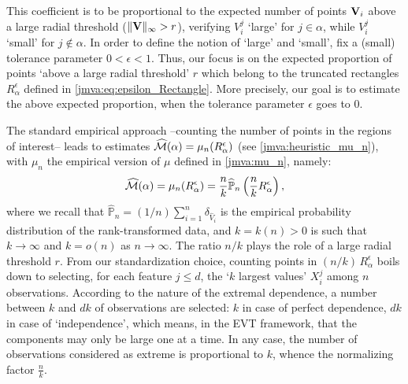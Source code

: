 This coefficient is to be proportional to the expected number of
points $\mathbf V_i$ above a large radial threshold ($\|\mathbf V\|_\infty >r$), verifying $V_i^j$ `large' for  $j \in\alpha$, 
while $V_i^j$ `small' for $j\notin \alpha$. 
In order to define the notion of `large' and `small', fix a (small)
tolerance parameter $0<\epsilon<1$. Thus, our focus is on the %
expected proportion of points `above a large radial threshold' $r$  which belong to
the truncated rectangles $R_\alpha^\epsilon $ defined in \eqref{jmva:eq:epsilon_Rectangle}. More precisely, our goal is to estimate the above
expected proportion, when the tolerance parameter $\epsilon$ goes to
$0$. 

The standard empirical approach  --counting the number of
points in the regions of interest-- leads to  estimates $\widehat{\mathcal{M}}(\alpha) = \mu_n(R_\alpha^\epsilon)$ (see \eqref{jmva:heuristic_mu_n}), with $\mu_n$ the empirical version of $\mu$ defined in \eqref{jmva:mu_n}, namely:
\begin{align}
\label{jmva:heuristic_mu_n2}
\widehat{\mathcal{M}}(\alpha) = \mu_n(R_\alpha^\epsilon) =  \frac{n}{k} \mathbb{\widehat P}_n \left ( \frac{n}{k} R_\alpha^\epsilon \right),
\end{align}
where we recall that $\mathbb{\widehat P}_n=(1/n)\sum_{i=1}^n\delta_{\widehat{V}_i}$ is the empirical probability distribution of the rank-transformed data, and
$k = k(n) >0$ is such that $k \to \infty$ and $k = o(n)$ as $n \to \infty$.
The ratio $n/k$ plays the role of a large radial threshold $r$. From our standardization choice, counting points in
$(n/k)\,R_\alpha^\epsilon$ boils down to selecting, for each feature $j\le d$, the `$k$ largest values' $X_i^j$
among $n$ observations. According to the nature of the extremal dependence,
a number between $k$ and $dk$ of observations are selected: $k$ in
case of perfect dependence, $dk$ in case of `independence', which
means, in the EVT framework, that the components may only be large one at a time. In
any case, the number of observations considered as extreme is proportional to $k$, whence the normalizing factor $\frac{n}{k}$. 

